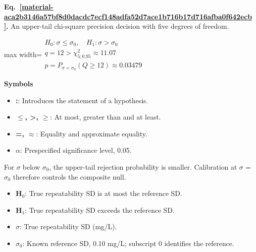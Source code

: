 \documentclass[11pt,a4paper]{article}
\begin{document}
\par\medskip
\begin{samepage}
\label{material-aca2b3146a57bf8d0dacdc7ecf148adfa52d7ace1b716b17d716afba0f642ecb}
\noindent\textbf{Eq.~\ref*{material-aca2b3146a57bf8d0dacdc7ecf148adfa52d7ace1b716b17d716afba0f642ecb}.} An upper-tail chi-square precision decision with five degrees of freedom.\par\nopagebreak
\begin{center}\begin{adjustbox}{max width=\linewidth}$\displaystyle \begin{gathered}H_0:\sigma\le\sigma_0,\quad H_1:\sigma>\sigma_0\\q=12>\chi^2_{5;0.95}\approx11.07\\p=P_{\sigma=\sigma_0}(Q\ge12)\approx0.03479\end{gathered}$\end{adjustbox}\end{center}

\par\noindent\textbf{Symbols}

\begin{itemize}\setlength{\itemsep}{1pt}\setlength{\parsep}{0pt}
\item \textbf{:}: Introduces the statement of a hypothesis.
\item \textbf{\ensuremath{\le}, >, \ensuremath{\ge}}: At most, greater than and at least.
\item \textbf{=, \ensuremath{\approx}}: Equality and approximate equality.
\item \textbf{\ensuremath{\alpha}}: Prespecified significance level, 0.05.
\end{itemize}

For \ensuremath{\sigma} below \ensuremath{\sigma}\ensuremath{{}_0}, the upper-tail rejection probability is smaller. Calibration at \ensuremath{\sigma} = \ensuremath{\sigma}\ensuremath{{}_0} therefore controls the composite null.

\begin{itemize}\setlength{\itemsep}{1pt}\setlength{\parsep}{0pt}
\item \textbf{H\ensuremath{{}_0}}: True repeatability SD is at most the reference SD.
\item \textbf{H\ensuremath{{}_1}}: True repeatability SD exceeds the reference SD.
\item \textbf{\ensuremath{\sigma}}: True repeatability SD (mg/L).
\item \textbf{\ensuremath{\sigma}\ensuremath{{}_0}}: Known reference SD, 0.10 mg/L; subscript 0 identifies the reference.
\end{itemize}


\end{samepage}
\end{document}
